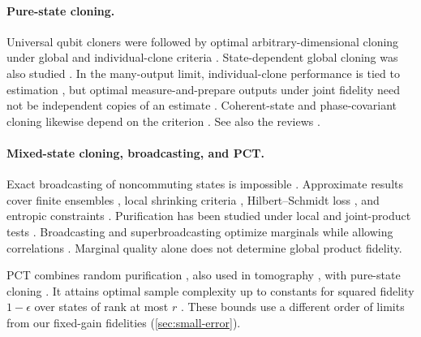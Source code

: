 \documentclass[11pt]{article}
\theoremstyle{remark}
\theoremstyle{plain}
\begin{document}
\paragraph{Pure-state cloning.}
Universal qubit cloners
\cite{BuzekHillery1996,GisinMassar1997,
BrussDiVincenzoEkertFuchsMacchiavelloSmolin1998} were followed by optimal
arbitrary-dimensional cloning under global \cite{Werner1998} and
individual-clone criteria \cite{KeylWerner1999}.
State-dependent global cloning was also studied
\cite{BrussDiVincenzoEkertFuchsMacchiavelloSmolin1998,CheflesBarnett1999}.
In the many-output limit, individual-clone performance is tied to estimation
\cite{MassarPopescu1995,BrussEkertMacchiavello1998,BaeAcin2006,
ChiribellaDAriano2006}, but optimal measure-and-prepare outputs under joint
fidelity need not be independent copies of an estimate
\cite{ChiribellaYang2014Optimal}.
Coherent-state and phase-covariant cloning likewise depend on the criterion
\cite{CerfKrugerNavezWernerWolf2005,KimChitambar2022}.  See also the reviews
\cite{ScaraniIblisdirGisinAcin2005,Chiribella2011EstimationCloning,
FanWangJingYueShiZhangMu2014}.

\paragraph{Mixed-state cloning, broadcasting, and PCT.}
Exact broadcasting of noncommuting states is impossible
\cite{BarnumCavesFuchsJozsaSchumacher1996,KalevHen2008}.
Approximate results cover finite ensembles
\cite{Rastegin2003Upper,Rastegin2002Relative,Rastegin2003StateDependent},
local shrinking criteria \cite{Fan2003,FanLiuShi2007}, Hilbert--Schmidt loss
\cite{Kazakov2007}, and entropic constraints \cite{LemmWilde2017}.
Purification has been studied under local and joint-product tests
\cite{CiracEkertMacchiavello1999,KeylWerner2001Purification}.
Broadcasting and superbroadcasting optimize marginals while allowing correlations
\cite{DArianoMacchiavelloPerinotti2005,
BuscemiDArianoMacchiavelloPerinotti2005Optimal,
BuscemiDArianoMacchiavelloPerinotti2006,DangFan2007}.
Marginal quality alone does not determine global product fidelity.

PCT combines random purification
\cite{TangWrightZhandry2025,GirardiMeleLami2025}, also used in tomography
\cite{PelecanosSpileckiTangWright2025}, with pure-state cloning
\cite{LiTheilHarrowChuang2026}.
It attains optimal sample complexity up to constants for squared fidelity
\(1-\epsilon\) over states of rank at most \(r\)
\cite{FanizzaGrinkoScharnhorstSpilecki2026,JeonSohnOh2026}.
These bounds use a different order of limits from our fixed-gain fidelities
(\cref{sec:small-error}).
\end{document}
